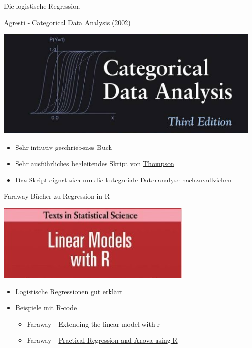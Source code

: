 \documentclass[ignorenonframetext,]{beamer}
\providecommand{\tightlist}{%
\setlength{\itemsep}{0pt}\setlength{\parskip}{0pt}}
\begin{document}
\begin{frame}[fragile]{Die logistische Regression}

\begin{block}{Agresti -
\href{https://mathdept.iut.ac.ir/sites/mathdept.iut.ac.ir/files/AGRESTI.PDF}{Categorical
Data Analysis (2002)}}

\includegraphics{./tex2pdf.9796/e62a7c255a40c0581f3d3ef287e31084fd26ed1b.png}

\begin{itemize}
\tightlist
\item
  Sehr intiutiv geschriebenes Buch
\item
  Sehr ausführliches begleitendes Skript von
  \href{http://statweb.stanford.edu/~owen/courses/306a/Splusdiscrete2.pdf}{Thompson}
\item
  Das Skript eignet sich um die kategoriale Datenanalyse
  nachzuvollziehen
\end{itemize}

\end{block}

\begin{block}{Faraway Bücher zu Regression in R}

\includegraphics{./tex2pdf.9796/1223d2e18b0151842020ec4783de22bd42a2b483.png}

\begin{itemize}
\item
  Logistische Regressionen gut erklärt
\item
  Beispiele mit R-code

  \begin{itemize}
  \item
    Faraway - Extending the linear model with r
  \item
    Faraway -
    \href{https://cran.r-project.org/doc/contrib/Faraway-PRA.pdf}{Practical
    Regression and Anova using R}
  \end{itemize}
\end{itemize}


\end{block}
\end{frame}
\end{document}
